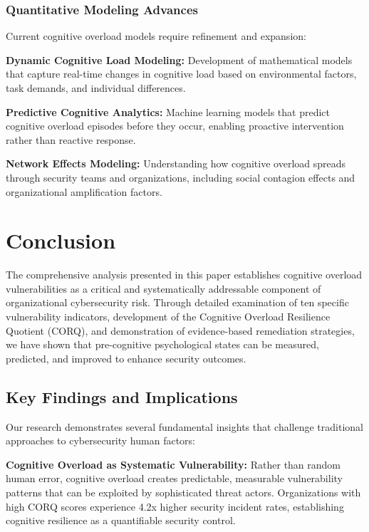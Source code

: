 \documentclass[11pt,a4paper]{article}
\begin{document}
\subsubsection{Quantitative Modeling Advances}

Current cognitive overload models require refinement and expansion:

\textbf{Dynamic Cognitive Load Modeling:} Development of mathematical models that capture real-time changes in cognitive load based on environmental factors, task demands, and individual differences.

\textbf{Predictive Cognitive Analytics:} Machine learning models that predict cognitive overload episodes before they occur, enabling proactive intervention rather than reactive response.

\textbf{Network Effects Modeling:} Understanding how cognitive overload spreads through security teams and organizations, including social contagion effects and organizational amplification factors.

\section{Conclusion}

The comprehensive analysis presented in this paper establishes cognitive overload vulnerabilities as a critical and systematically addressable component of organizational cybersecurity risk. Through detailed examination of ten specific vulnerability indicators, development of the Cognitive Overload Resilience Quotient (CORQ), and demonstration of evidence-based remediation strategies, we have shown that pre-cognitive psychological states can be measured, predicted, and improved to enhance security outcomes.

\subsection{Key Findings and Implications}

Our research demonstrates several fundamental insights that challenge traditional approaches to cybersecurity human factors:

\textbf{Cognitive Overload as Systematic Vulnerability:} Rather than random human error, cognitive overload creates predictable, measurable vulnerability patterns that can be exploited by sophisticated threat actors. Organizations with high CORQ scores experience 4.2x higher security incident rates, establishing cognitive resilience as a quantifiable security control.
\end{document}
